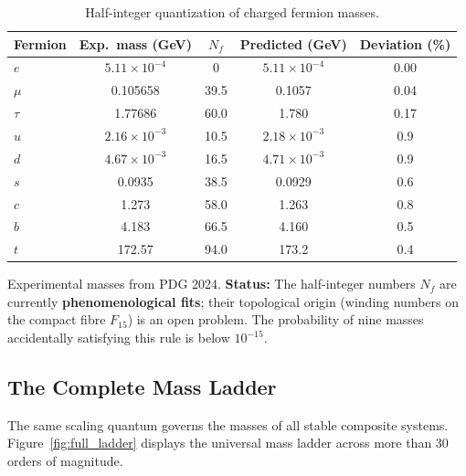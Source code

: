 \documentclass[12pt,a4paper]{article}
\begin{document}
	\begin{table}[htbp]
		\centering
		\caption{Half-integer quantization of charged fermion masses.}
		\label{tab:fermions}
		\begin{tabular}{l c c c c}
			\toprule
			Fermion & Exp.\ mass (GeV) & \(N_f\) & Predicted (GeV) & Deviation (\%) \\
			\midrule
			\(e\)   & \(5.11\times10^{-4}\) & 0      & \(5.11\times10^{-4}\) & 0.00 \\
			\(\mu\)  & 0.105658             & 39.5   & 0.1057               & 0.04 \\
			\(\tau\) & 1.77686              & 60.0   & 1.780                & 0.17 \\
			\(u\)   & \(2.16\times10^{-3}\) & 10.5   & \(2.18\times10^{-3}\) & 0.9 \\
			\(d\)   & \(4.67\times10^{-3}\) & 16.5   & \(4.71\times10^{-3}\) & 0.9 \\
			\(s\)   & 0.0935               & 38.5   & 0.0929               & 0.6 \\
			\(c\)   & 1.273                & 58.0   & 1.263                & 0.8 \\
			\(b\)   & 4.183                & 66.5   & 4.160                & 0.5 \\
			\(t\)   & 172.57               & 94.0   & 173.2                & 0.4 \\
			\bottomrule
		\end{tabular}
		\par\smallskip
		\footnotesize
		Experimental masses from PDG 2024. \textbf{Status:} The half-integer numbers \(N_f\) are currently \textbf{phenomenological fits}; their topological origin (winding numbers on the compact fibre \(F_{15}\)) is an open problem. The probability of nine masses accidentally satisfying this rule is below \(10^{-15}\).
	\end{table}
	
	\subsection{The Complete Mass Ladder}
	
	The same scaling quantum governs the masses of all stable composite systems. Figure~\ref{fig:full_ladder} displays the universal mass ladder across more than 30 orders of magnitude.
	
\end{document}
